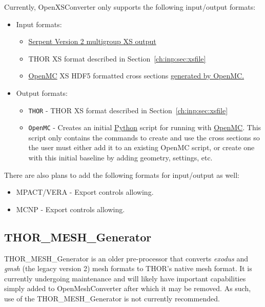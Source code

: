 Currently, OpenXSConverter only supports the following input/output formats:
\begin{itemize}
  \item Input formats:
    \begin{itemize}
      \item \href{https://serpent.vtt.fi/mediawiki/index.php/Description_of_output_files}{Serpent Version 2 multigroup \ac{XS} output}
      \item THOR \ac{XS} format described in Section~\ref{ch:inp:sec:xsfile}
      \item \href{https://docs.openmc.org/en/stable/}{OpenMC} \ac{XS} HDF5 formatted cross sections \href{https://nbviewer.org/github/openmc-dev/openmc-notebooks/blob/main/mgxs-part-i.ipynb}{generated by OpenMC.}
    \end{itemize}
  \item Output formats:
    \begin{itemize}
      \item \verb"THOR" - THOR \ac{XS} format described in Section~\ref{ch:inp:sec:xsfile}
      \item \verb"OpenMC" - Creates an initial \href{https://www.python.org/}{Python} script for running with \href{https://docs.openmc.org/en/stable/}{OpenMC}.
        This script only contains the commands to create and use the cross sections so the user must either add it to an existing OpenMC script, or create one with this initial baseline by adding geometry, settings, etc.
    \end{itemize}
\end{itemize}
There are also plans to add the following formats for input/output as well:
\begin{itemize}
  \item MPACT/VERA - Export controls allowing.
  \item MCNP - Export controls allowing.
\end{itemize}

\subsection{THOR\_MESH\_Generator}

THOR\_MESH\_Generator is an older pre-processor that converts \textit{exodus} and \textit{gmsh} (the legacy version 2) mesh formats to \ac{THOR}'s native mesh format.
It is currently undergoing maintenance and will likely have important capabilities simply added to OpenMeshConverter after which it may be removed.
As such, use of the THOR\_MESH\_Generator is not currently recommended.

